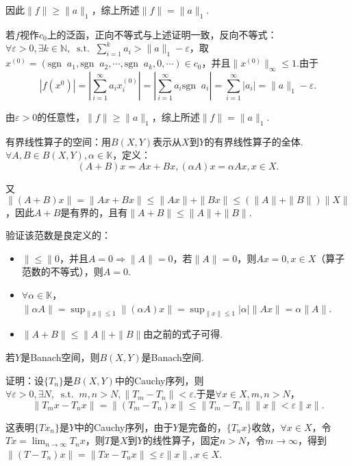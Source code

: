 \documentclass[bwprint, withoutpreface]{cumcmthesis}
\newcommand*{\st}{\mathop{}\!\mathrm{s.t.}\!\mathop{}}
\newcommand*{\norm}[1]{\| #1 \|}
\newcommand*{\nnorm}[2]{\| #1 \|_{#2}}
\newcommand*{\sgn}[1]{\mathrm{sgn}\!\mathop{}#1}
\begin{document}
因此$\norm{f} \geqslant \nnorm{a}{1}$，综上所述$\norm{f} = \nnorm{a}{1}$.

若$f$视作$c_0$上的泛函，正向不等式与上述证明一致，反向不等式：$\forall \varepsilon > 0, \exists k \in \mathbb{N}, \st \sum_{i = 1}^{k}{a_i} > \nnorm{a}{1} - \varepsilon$，取$x^{(0)} = (\sgn{a_1}, \sgn{a_2}, \cdots, \sgn{a_k}, 0, \cdots) \in c_0$，并且$\nnorm{x^{(0)}}{\infty} \leqslant 1$.由于
\begin{equation*}
	|f(x^{0})| = |\sum_{i = 1}^{\infty}{a_i x_i^{(0)}}| = |\sum_{i = 1}^{\infty}{a_i \sgn{a_i}}| = \sum_{i = 1}^{\infty}{|a_i|} = \nnorm{a}{1} - \varepsilon.
\end{equation*}

由$\varepsilon > 0$的任意性，$\norm{f} \geqslant \nnorm{a}{1}$，综上所述$\norm{f} = \nnorm{a}{1}$.

有界线性算子的空间：用$B(X, Y)$表示从$X$到$Y$的有界线性算子的全体.$\forall A, B \in B(X, Y), \alpha \in \mathbb{K}$，定义：
\begin{equation*}
	(A + B)x = Ax + Bx, (\alpha A)x = \alpha A x, x \in X.
\end{equation*}

又$\norm{(A + B)x} = \norm{Ax + Bx} \leqslant \norm{Ax} + \norm{Bx} \leqslant (\norm{A} + \norm{B})\norm{X}$，因此$A + B$是有界的，且有$\norm{A + B} \leqslant \norm{A} + \norm{B}$.

验证该范数是良定义的：
\begin{itemize}[itemindent=2em]
	\item $\norm \leqslant 0$，并且$A = 0 \Rightarrow \norm{A} = 0$，若$\norm{A} = 0$，则$Ax = 0, x \in X$（算子范数的不等式），则$A = 0$.
	\item $\forall \alpha \in \mathbb{K}$，$\norm{\alpha A} = \sup_{\norm{x} \leqslant 1}{\norm{(\alpha A) x}} = \sup_{\norm{x} \leqslant 1}{|\alpha| \norm{Ax}} = \alpha \norm{A}$.
	\item $\norm{A + B} \leqslant \norm{A} + \norm{B}$由之前的式子可得.
\end{itemize}

若$Y$是Banach空间，则$B(X, Y)$是Banach空间.

证明：设$\{T_n\}$是$B(X, Y)$中的Cauchy序列，则$\forall \varepsilon > 0, \exists N, \st m, n > N, \norm{T_m - T_n} < \varepsilon$.于是$\forall x \in X, m, n > N$，\[\norm{T_m x - T_n x} = \norm{(T_m - T_n)x} \leqslant \norm{T_m - T_n} \norm{x} < \varepsilon \norm{x}.\]

这表明$\{T x_n\}$是$Y$中的Cauchy序列，由于$Y$是完备的，$\{T_n x\}$收敛，$\forall x \in X$，令$Tx = \lim_{n \to \infty}{T_n x}$，则$T$是$X$到$Y$的线性算子，固定$n > N$，令$m \to \infty$，得到$\norm{(T - T_n)x} = \norm{Tx - T_n x} \leqslant \varepsilon \norm{x}, x \in X$.
\end{document}
